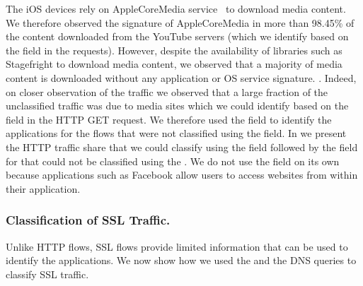 The iOS devices rely on AppleCoreMedia service~\cite{apple:coremedia}
to download media content.  We therefore observed the signature of
AppleCoreMedia in more than 98.45\% of the content downloaded from the
YouTube servers (which we identify based on the \httphost field in the
\httpget requests).  However, despite the availability of libraries
such as Stagefright\cite{android:stagefright} to download media
content, we observed that a majority of media content is downloaded
without any application or OS service signature.  .  Indeed,
on closer observation of the traffic we observed that a large fraction
of the unclassified traffic was due to media sites which we could
identify based on the \httphost field in the HTTP GET request.  We
therefore used the \httphost field to identify the applications for
the flows that were not classified using the \useragent field.  In
 we present the HTTP
traffic share that we could classify using the \useragent field
followed by the \httphost field for that could not be classified using
the \useragent.  We do not use the \httphost field on its own because
applications such as Facebook allow users to access websites from
within their application.

\subsubsection{Classification of SSL Traffic.}

Unlike HTTP flows, SSL flows provide limited information that can be
used to identify the applications.  We now show how we used the
\sslservername and the DNS queries to classify SSL traffic.

